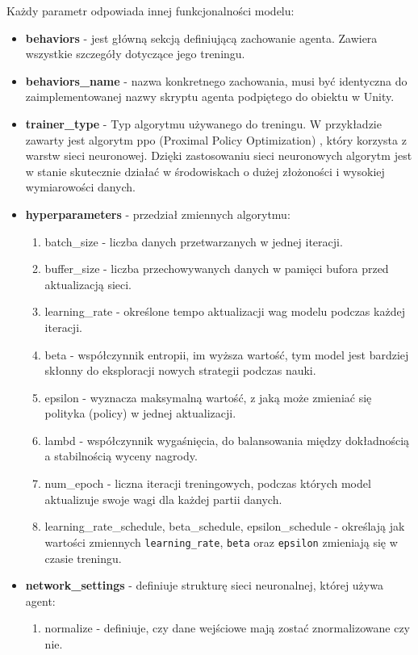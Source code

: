 \documentclass[a4paper,twoside,12pt]{book}
\begin{document}
		Każdy parametr odpowiada innej funkcjonalności modelu:
		\begin{itemize}
			\item \textbf{behaviors} - jest główną sekcją definiującą zachowanie agenta. Zawiera wszystkie szczegóły dotyczące jego treningu.
			\item \textbf{behaviors\_name} - nazwa konkretnego zachowania, musi być identyczna do zaimplementowanej nazwy skryptu agenta podpiętego do obiektu w Unity.
			\item \textbf{trainer\_type} - Typ algorytmu używanego do treningu. W przykładzie zawarty jest algorytm ppo (Proximal Policy Optimization)\cite{bib:schulman2017proximal} , który korzysta z warstw sieci neuronowej. Dzięki zastosowaniu sieci neuronowych algorytm jest w stanie skutecznie działać w środowiskach o dużej złożoności i wysokiej wymiarowości danych.
			\item \textbf{hyperparameters} - przedział zmiennych algorytmu:
			\begin{enumerate}
				\item batch\_size - liczba danych przetwarzanych w jednej iteracji.
				\item buffer\_size - liczba przechowywanych danych w pamięci bufora przed aktualizacją sieci.
				\item learning\_rate - określone tempo aktualizacji wag modelu podczas każdej iteracji.
				\item beta - współczynnik entropii, im wyższa wartość, tym model jest bardziej skłonny do eksploracji nowych strategii podczas nauki.
				\item epsilon - wyznacza maksymalną wartość, z jaką może zmieniać się polityka (policy) w jednej aktualizacji.
				\item lambd - współczynnik wygaśnięcia, do balansowania między dokładnością a stabilnością wyceny nagrody.
				\item num\_epoch - liczna iteracji treningowych, podczas których model aktualizuje swoje wagi dla każdej partii danych.
				\item learning\_rate\_schedule, beta\_schedule, epsilon\_schedule - określają jak wartości zmiennych \texttt{learning\_rate}, \texttt{beta} oraz \texttt{epsilon} zmieniają się w czasie treningu.
			\end{enumerate}
			\item \textbf{network\_settings} - definiuje strukturę sieci neuronalnej, której używa agent:
			\begin{enumerate}
				\item normalize - definiuje, czy dane wejściowe mają zostać znormalizowane czy nie.

\end{enumerate}
\end{itemize}
\end{document}
